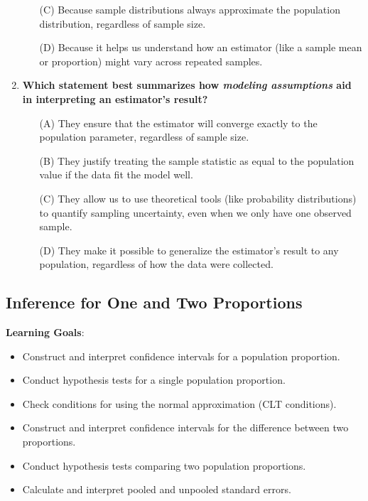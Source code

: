 \documentclass{article}
\begin{document}
\begin{enumerate}
\begin{enumerate}
        \item[(C)] Because sample distributions always approximate the population distribution, regardless of sample size.
        \item[(D)] Because it helps us understand how an estimator (like a sample mean or proportion) might vary across repeated samples.
        \end{enumerate}
    \item  \textbf{Which statement best summarizes how \emph{modeling assumptions} aid in interpreting an estimator's result?}
        \begin{enumerate}
        \item[(A)] They ensure that the estimator will converge exactly to the population parameter, regardless of sample size.
        \item[(B)] They justify treating the sample statistic as equal to the population value if the data fit the model well.
        \item[(C)] They allow us to use theoretical tools (like probability distributions) to quantify sampling uncertainty, even when we only have one observed sample.
        \item[(D)] They make it possible to generalize the estimator’s result to any population, regardless of how the data were collected.
        \end{enumerate}
\end{enumerate}

\subsection{Inference for One and Two Proportions}
\textbf{Learning Goals}:
\begin{itemize}
    \item Construct and interpret confidence intervals for a population proportion.
    \item Conduct hypothesis tests for a single population proportion.
    \item Check conditions for using the normal approximation (CLT conditions).
    \item Construct and interpret confidence intervals for the difference between two proportions.
    \item Conduct hypothesis tests comparing two population proportions.
    \item Calculate and interpret pooled and unpooled standard errors.
\end{itemize}
\end{document}
